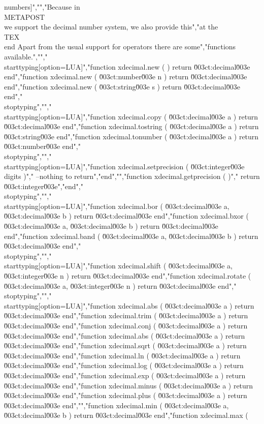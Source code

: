 numbers]","","Because in \\METAPOST\\ we support the decimal number system, we also provide this","at the \\TEX\\ end Apart from the usual support for operators there are some","functions available.","","\\starttyping[option=LUA]","function xdecimal.new ( )              return \u003ct:decimal\u003e end","function xdecimal.new ( \u003ct:number\u003e n ) return \u003ct:decimal\u003e end","function xdecimal.new ( \u003ct:string\u003e s ) return \u003ct:decimal\u003e end","\\stoptyping","","\\starttyping[option=LUA]","function xdecimal.copy     ( \u003ct:decimal\u003e a ) return \u003ct:decimal\u003e end","function xdecimal.tostring ( \u003ct:decimal\u003e a ) return \u003ct:string\u003e  end","function xdecimal.tonumber ( \u003ct:decimal\u003e a ) return \u003ct:number\u003e  end","\\stoptyping","","\\starttyping[option=LUA]","function xdecimal.setprecision ( \u003ct:integer\u003e digits )","    --nothing to return","end","","function xdecimal.getprecision ( )","    return \u003ct:integer\u003e","end","\\stoptyping","","\\starttyping[option=LUA]","function xdecimal.bor  ( \u003ct:decimal\u003e a, \u003ct:decimal\u003e b ) return \u003ct:decimal\u003e end","function xdecimal.bxor ( \u003ct:decimal\u003e a, \u003ct:decimal\u003e b ) return \u003ct:decimal\u003e end","function xdecimal.band ( \u003ct:decimal\u003e a, \u003ct:decimal\u003e b ) return \u003ct:decimal\u003e end","\\stoptyping","","\\starttyping[option=LUA]","function xdecimal.shift  ( \u003ct:decimal\u003e a, \u003ct:integer\u003e n ) return \u003ct:decimal\u003e end","function xdecimal.rotate ( \u003ct:decimal\u003e a, \u003ct:integer\u003e n ) return \u003ct:decimal\u003e end","\\stoptyping","","\\starttyping[option=LUA]","function xdecimal.abs   ( \u003ct:decimal\u003e a ) return \u003ct:decimal\u003e end","function xdecimal.trim  ( \u003ct:decimal\u003e a ) return \u003ct:decimal\u003e end","function xdecimal.conj  ( \u003ct:decimal\u003e a ) return \u003ct:decimal\u003e end","function xdecimal.abs   ( \u003ct:decimal\u003e a ) return \u003ct:decimal\u003e end","function xdecimal.sqrt  ( \u003ct:decimal\u003e a ) return \u003ct:decimal\u003e end","function xdecimal.ln    ( \u003ct:decimal\u003e a ) return \u003ct:decimal\u003e end","function xdecimal.log   ( \u003ct:decimal\u003e a ) return \u003ct:decimal\u003e end","function xdecimal.exp   ( \u003ct:decimal\u003e a ) return \u003ct:decimal\u003e end","function xdecimal.minus ( \u003ct:decimal\u003e a ) return \u003ct:decimal\u003e end","function xdecimal.plus  ( \u003ct:decimal\u003e a ) return \u003ct:decimal\u003e end","","function xdecimal.min ( \u003ct:decimal\u003e a, \u003ct:decimal\u003e b ) return \u003ct:decimal\u003e end","function xdecimal.max ( 